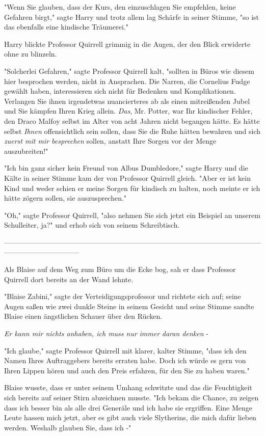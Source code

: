 {"Wenn Sie glauben, dass der Kurs, den einzuschlagen Sie empfehlen, keine Gefahren birgt," sagte Harry und trotz allem lag Schärfe in seiner Stimme, "so ist das ebenfalls eine kindische Träumerei."

Harry blickte Professor Quirrell grimmig in die Augen, der den Blick erwiderte ohne zu blinzeln.

"Solcherlei Gefahren," sagte Professor Quirrell kalt, "sollten in Büros wie diesem hier besprochen werden, nicht in Ansprachen. Die Narren, die Cornelius Fudge gewählt haben, interessieren sich nicht für Bedenken und Komplikationen. Verlangen Sie ihnen irgendetwas nuancierteres ab als einen mitreißenden Jubel und Sie kämpfen Ihren Krieg allein. \emph{Das}, Mr. Potter, war Ihr kindischer Fehler, den Draco Malfoy selbst im Alter von acht Jahren nicht begangen hätte. Es hätte selbst \emph{Ihnen} offensichtlich sein sollen, dass Sie die Ruhe hätten bewahren und sich \emph{zuerst mit mir besprechen} sollen, anstatt Ihre Sorgen vor der Menge auszubreiten!"

"Ich bin ganz sicher kein Freund von Albus Dumbledore," sagte Harry und die Kälte in seiner Stimme kam der von Professor Quirrell gleich. "Aber er ist kein Kind und weder schien er meine Sorgen für kindisch zu halten, noch meinte er ich hätte zögern sollen, sie auszusprechen."

"Oh," sagte Professor Quirrell, "also nehmen Sie sich jetzt ein Beispiel an unserem Schulleiter, ja?" und erhob sich von seinem Schreibtisch.

--------------------------------------------------------------------------------------------------------------------------------------------

Als Blaise auf dem Weg zum Büro um die Ecke bog, sah er dass Professor Quirrell dort bereits an der Wand lehnte.

"Blaise Zabini," sagte der Verteidigungsprofessor und richtete sich auf; seine Augen saßen wie zwei dunkle Steine in seinem Gesicht und seine Stimme sandte Blaise einen ängstlichen Schauer über den Rücken.

\emph{Er kann mir nichts anhaben, ich muss nur} \emph{immer} \emph{daran denken} -

"Ich glaube," sagte Professor Quirrell mit klarer, kalter Stimme, "dass ich den Namen Ihres Auftraggebers bereits erraten habe. Doch ich würde es gern von Ihren Lippen hören und auch den Preis erfahren, für den Sie zu haben waren."

Blaise wusste, dass er unter seinem Umhang schwitzte und das die Feuchtigkeit sich bereits auf seiner Stirn abzeichnen musste. "Ich bekam die Chance, zu zeigen dass ich besser bin als alle drei Generäle und ich habe sie ergriffen. Eine Menge Leute hassen mich jetzt, aber es gibt auch viele Slytherins, die mich dafür lieben werden. Weshalb glauben Sie, dass ich -"

}
